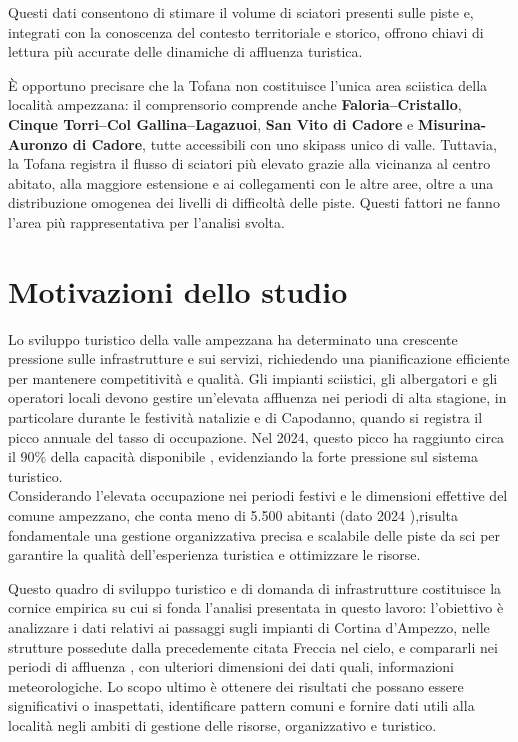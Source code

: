 Questi dati consentono di stimare il volume di sciatori presenti sulle piste e, integrati con la conoscenza del contesto territoriale e storico, offrono chiavi di lettura più accurate delle dinamiche di affluenza turistica.

È opportuno precisare che la Tofana non costituisce l’unica area sciistica della località ampezzana: il comprensorio comprende anche \textbf{Faloria–Cristallo}, \textbf{Cinque Torri–Col Gallina–Lagazuoi}, \textbf{San Vito di Cadore} e \textbf{Misurina-Auronzo di Cadore}, tutte accessibili con uno skipass unico di valle. Tuttavia, la Tofana registra il flusso di sciatori più elevato grazie alla vicinanza al centro abitato, alla maggiore estensione e ai collegamenti con le altre aree, oltre a una distribuzione omogenea dei livelli di difficoltà delle piste. Questi fattori ne fanno l’area più rappresentativa per l’analisi svolta.


\section{Motivazioni dello studio}
Lo sviluppo turistico della valle ampezzana ha determinato una crescente pressione sulle infrastrutture e sui servizi, richiedendo una pianificazione efficiente per mantenere competitività e qualità. Gli impianti sciistici, gli albergatori e gli operatori locali devono gestire un’elevata affluenza nei periodi di alta stagione, in particolare durante le festività natalizie e di Capodanno, quando si registra il picco annuale del tasso di occupazione. Nel 2024, questo picco ha raggiunto circa il 90\% della capacità disponibile \cite{Andreazza2024CortinaTourismo}, evidenziando la forte pressione sul sistema turistico.\\

Considerando l’elevata occupazione nei periodi festivi e le dimensioni effettive del comune ampezzano, che conta meno di 5.500 abitanti (dato 2024 \cite{cortina_wiki}),risulta fondamentale una gestione organizzativa precisa e scalabile delle piste da sci per garantire la qualità dell’esperienza turistica e ottimizzare le risorse.


Questo quadro di sviluppo turistico e di domanda di infrastrutture costituisce la cornice empirica su cui si fonda l’analisi presentata in questo lavoro: l’obiettivo è analizzare i dati relativi ai passaggi sugli impianti di Cortina d'Ampezzo, nelle strutture possedute dalla precedemente citata Freccia nel cielo,  e compararli nei periodi di affluenza , con ulteriori dimensioni dei dati quali, informazioni meteorologiche. 
Lo scopo ultimo è ottenere dei risultati che possano essere significativi o inaspettati, identificare pattern comuni e  fornire dati utili alla località negli ambiti di gestione delle risorse, organizzativo e turistico. \\

